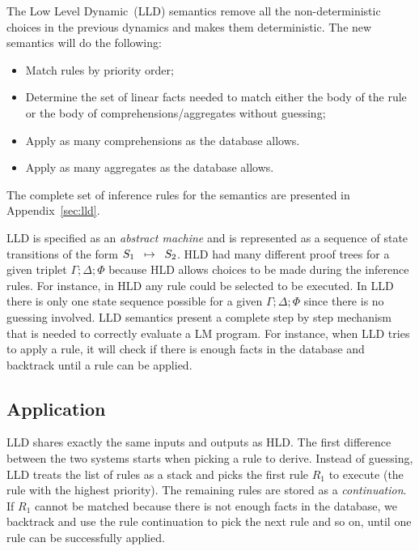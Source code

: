 The Low Level Dynamic~(LLD) semantics remove all the non-deterministic choices
in the previous dynamics and makes them deterministic. The new semantics will do
the following:

\begin{itemize}

   \item Match rules by priority order;

   \item Determine the set of linear facts needed to match either the body of
   the rule or the body of comprehensions/aggregates without guessing;

   \item Apply as many comprehensions as the database allows.

   \item Apply as many aggregates as the database allows.

\end{itemize}

The complete set of inference rules for the semantics are presented in
Appendix~\ref{sec:lld}.

LLD is specified as an \emph{abstract machine} and is represented as a sequence
of state transitions of the form $S_1 \;\; \mapsto \;\; S_2$. HLD had many different
proof trees for a given triplet $\Gamma; \Delta; \Phi$ because HLD allows
choices to be made during the inference rules. For instance, in HLD any rule
could be selected to be executed.  In LLD there is only one state sequence
possible for a given $\Gamma; \Delta; \Phi$ since there is no guessing involved.
LLD semantics present a complete step by step mechanism that is needed to
correctly evaluate a LM program. For instance, when LLD tries to apply a rule,
it will check if there is enough facts in the database and backtrack
until a rule can be applied.

\subsection{Application}

LLD shares exactly the same inputs and outputs as HLD. The first difference
between the two systems starts when picking a rule to derive.  Instead of
guessing, LLD treats the list of rules as a stack and picks the first rule $R_1$
to execute (the rule with the highest priority). The remaining rules are stored
as a \emph{continuation}. If $R_1$ cannot be matched because there is not enough
facts in the database, we backtrack and use the rule continuation to pick the
next rule and so on, until one rule can be successfully applied.

